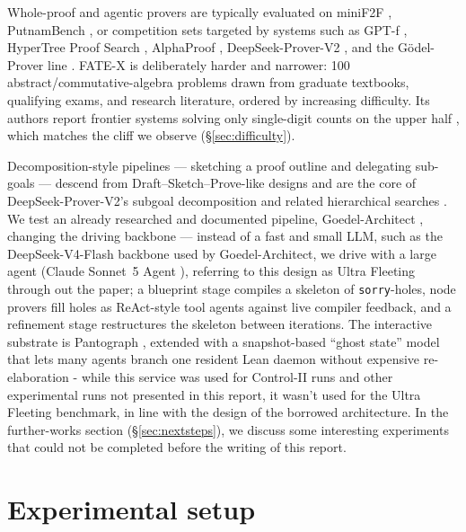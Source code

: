 \documentclass[12pt, a4paper]{article}
\begin{document}
Whole-proof and agentic provers are typically evaluated on miniF2F
\cite{zheng2022minif2f}, PutnamBench \cite{tsoukalas2024putnambench}, or
competition sets targeted by systems such as GPT-f \cite{polu2020gptf},
HyperTree Proof Search \cite{lample2022hypertree}, AlphaProof
\cite{alphaproof2024}, DeepSeek-Prover-V2 \cite{deepseekproverv2}, and the
G\"odel-Prover line \cite{davis2025goedelspoetry}. FATE-X \cite{fatex2025}
is deliberately harder and narrower: 100 abstract/commutative-algebra problems
drawn from graduate textbooks, qualifying exams, and research literature,
ordered by increasing difficulty. Its authors report frontier systems solving
only single-digit counts on the upper half \cite{benchmarklist_fatex}, which
matches the cliff we observe (\S\ref{sec:difficulty}). 

Decomposition-style pipelines --- sketching a proof outline and delegating
sub-goals --- descend from Draft--Sketch--Prove-like designs and are the core of
DeepSeek-Prover-V2's subgoal decomposition \cite{deepseekproverv2} and related
hierarchical searches \cite{lample2022hypertree,decomposition_openreview}. We test an already
researched and documented pipeline, Goedel-Architect \cite{goedelarchitect}, changing the driving
backbone --- instead of a fast and small LLM, such as the DeepSeek-V4-Flash backbone used by
Goedel-Architect, we drive with a large agent (Claude Sonnet~5 Agent \cite{anthropic2026sonnet5}),
referring to this design as Ultra Fleeting through out the paper;
a blueprint stage compiles a
skeleton of \texttt{sorry}-holes, node provers fill holes as ReAct-style tool
agents \cite{yao2023react} against live compiler feedback, and a refinement
stage restructures the skeleton between iterations. The interactive substrate
is Pantograph \cite{aniva2024pantograph,pypantograph}, extended with a
snapshot-based ``ghost state'' model \cite{shen2026snapshot,leakii2026upgrade}
that lets many agents branch one resident Lean daemon without expensive re-elaboration - while 
this service was used for Control-II runs and other experimental runs not presented in this report, 
it wasn't used for the Ultra Fleeting benchmark, in line with the design of
the borrowed architecture. In the further-works section (\S\ref{sec:nextsteps}), we discuss some
interesting experiments that could not be completed before the writing of this report.

\section{Experimental setup}
\end{document}
